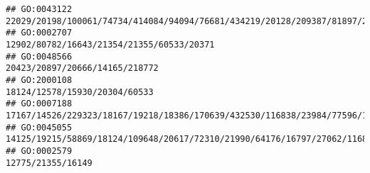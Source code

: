 \documentclass[
]{article}
\begin{document}
\begin{verbatim}
## GO:0043122                                                                                                                                                                                                                                                                                                          22029/20198/100061/74734/414084/94094/76681/434219/20128/209387/81897/29820/21943/16994/24108/16149
## GO:0002707                                                                                                                                                                                                                                                                                                                                                                    12902/80782/16643/21354/21355/60533/20371
## GO:0048566                                                                                                                                                                                                                                                                                                                                                                               20423/20897/20666/14165/218772
## GO:2000108                                                                                                                                                                                                                                                                                                                                                                                18124/12578/15930/20304/60533
## GO:0007188                                                                                                                                                                                                                                                                                                         17167/14526/229323/18167/19218/18386/170639/432530/116838/23984/77596/14680/15566/11551/12766/237175
## GO:0045055                                                                                                                                                                                                                                                                                                            14125/19215/58869/18124/109648/20617/72310/21990/64176/16797/27062/116838/58226/14126/11551/12229
## GO:0002579                                                                                                                                                                                                                                                                                                                                                                                            12775/21355/16149

\end{verbatim}
\end{document}
